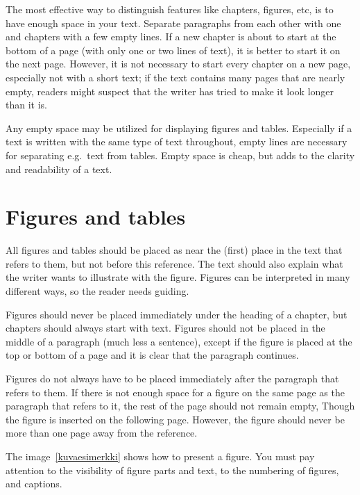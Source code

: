 The most effective way to distinguish features like chapters, figures, etc,  is to have enough space 
in your text.  Separate paragraphs from each other with one and chapters with a few empty lines.  If a 
new chapter is about to start at the bottom of a page (with only one or two lines of text), it is better 
to start it on the next page.  However, it is not necessary to start every chapter on a new page, especially 
not with a short text; if the text contains many pages that are nearly empty, readers might suspect that the 
writer has tried to make it look longer than it is.


Any empty space may be utilized for displaying figures and tables.  Especially if a text is written with the 
same type of text throughout, empty lines are necessary for separating e.g.~text from tables.  Empty space 
is cheap, but adds to the clarity and readability of a text.

\section{Figures and tables}


All figures and tables should be placed as near the (first) place in the text that refers to them, but 
not before this reference. The text should also explain what the writer wants to illustrate with the 
figure. Figures can be interpreted in many different ways, so the reader needs guiding.

Figures should never be placed immediately under the heading of a chapter, but chapters should always 
start with text. Figures should not be placed in the middle of a paragraph (much less a sentence), except 
if the figure is placed at the top or bottom of a page and it is clear that the paragraph continues.

Figures do not always have to be placed immediately after the paragraph that refers to them. If there is 
not enough space for a figure on the same page as the paragraph that refers to it, the rest of the page 
should not remain empty, Though the figure is inserted on the following page. However, the figure should 
never be more than one page away from the reference.


The image~\ref{kuvaesimerkki} shows how to present a figure. You must pay attention to the visibility of 
figure parts and text, to the numbering of figures, and captions. 

